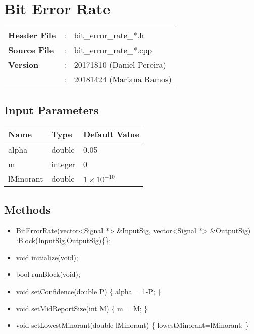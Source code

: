 \clearpage

\section{Bit Error Rate}
\label{sec:bit_error_rate}
\begin{refsection}

\begin{tcolorbox}	
\begin{tabular}{p{2.75cm} p{0.2cm} p{10.5cm}} 	
\textbf{Header File}    &:& bit\_error\_rate\_*.h \\
\textbf{Source File}    &:& bit\_error\_rate\_*.cpp \\
\textbf{Version}        &:& 20171810 (Daniel Pereira)\\
                        &:& 20181424 (Mariana Ramos)
\end{tabular}
\end{tcolorbox}

\subsection*{Input Parameters}

\begin{table}[H]
\centering
\begin{tabular}{|l|l|l|}
\hline
Name           & Type           & Default Value     \\ \hline
alpha          & double         & 0.05              \\ \hline
m              & integer        & 0                 \\ \hline
lMinorant      & double         & $1\times10^{-10}$ \\ \hline
\end{tabular}
\end{table}


\subsection*{Methods}

\begin{itemize}
  \item BitErrorRate(vector<Signal *> \&InputSig, vector<Signal *> \&OutputSig) :Block(InputSig,OutputSig)\{\};
  \item void initialize(void);
  \item bool runBlock(void);
  \item void setConfidence(double P) \{ alpha = 1-P; \}
  \item void setMidReportSize(int M) \{ m = M; \}
  \item void setLowestMinorant(double lMinorant) \{ lowestMinorant=lMinorant; \}
\end{itemize}





\end{refsection}
